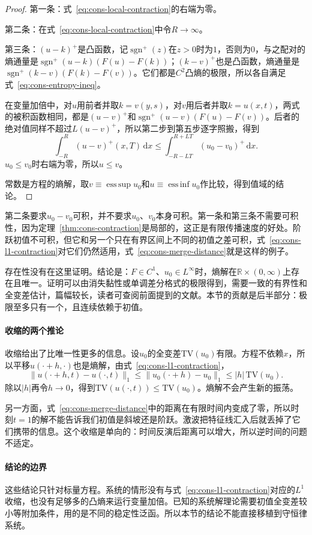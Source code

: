 \begin{proof}
第一条：式~\eqref{eq:cons-local-contraction}的右端为零。

第二条：在式~\eqref{eq:cons-local-contraction}中令$R\to\infty$。

第三条：$(u-k)^{+}$是凸函数，记$\operatorname{sgn}^{+}(z)$在$z>0$时为$1$，否则为$0$，与之配对的熵通量是$\operatorname{sgn}^{+}(u-k)(F(u)-F(k))$；$(k-v)^{+}$也是凸函数，熵通量是$\operatorname{sgn}^{+}(k-v)(F(k)-F(v))$。它们都是$C^2$凸熵的极限，所以各自满足式~\eqref{eq:cons-entropy-ineq}。

在变量加倍中，对$u$用前者并取$k=v(y,s)$，对$v$用后者并取$k=u(x,t)$，两式的被积函数相同，都是$(u-v)^{+}$和$\operatorname{sgn}^{+}(u-v)(F(u)-F(v))$。后者的绝对值同样不超过$L(u-v)^{+}$，所以第二步到第五步逐字照搬，得到
\[
  \int_{-R}^{R}(u-v)^{+}(x,T)\,\mathrm{d}x
  \leq\int_{-R-LT}^{R+LT}(u_0-v_0)^{+}\,\mathrm{d}x .
\]
$u_0\leq v_0$时右端为零，所以$u\leq v$。

常数是方程的熵解，取$v\equiv\operatorname*{ess\,sup}u_0$和$u\equiv\operatorname*{ess\,inf}u_0$作比较，得到值域的结论。
\end{proof}

第二条要求$u_0-v_0$可积，并不要求$u_0$、$v_0$本身可积。第一条和第三条不需要可积性，因为定理~\ref{thm:cons-contraction}是局部的，这正是有限传播速度的好处。阶跃初值不可积，但它和另一个只在有界区间上不同的初值之差可积，式~\eqref{eq:cons-l1-contraction}对它们仍然适用，式~\eqref{eq:cons-merge-distance}就是这样的例子。

存在性没有在这里证明。结论是：$F\in C^1$、$u_0\in L^{\infty}$时，熵解在$\mathbb{R}\times(0,\infty)$上存在且唯一。证明可以由消失黏性或单调差分格式的极限得到，需要一致的有界性和全变差估计，篇幅较长，读者可查阅前面提到的文献。本节的贡献是后半部分：极限至多只有一个，且连续依赖于初值。

\paragraph{收缩的两个推论}
收缩给出了比唯一性更多的信息。设$u_0$的全变差$\mathrm{TV}(u_0)$有限。方程不依赖$x$，所以平移$u(\cdot+h,\cdot)$也是熵解，由式~\eqref{eq:cons-l1-contraction}，
\[
  \lVert u(\cdot+h,t)-u(\cdot,t)\rVert_1\leq\lVert u_0(\cdot+h)-u_0\rVert_1\leq\lvert h\rvert\,\mathrm{TV}(u_0).
\]
除以$\lvert h\rvert$再令$h\to0$，得到$\mathrm{TV}(u(\cdot,t))\leq\mathrm{TV}(u_0)$。熵解不会产生新的振荡。

另一方面，式~\eqref{eq:cons-merge-distance}中的距离在有限时间内变成了零，所以时刻$t=1$的解不能告诉我们初值是斜坡还是阶跃。激波把特征线汇入后就丢掉了它们携带的信息。这个收缩是单向的：时间反演后距离可以增大，所以逆时间的问题不适定。

\paragraph{结论的边界}
这些结论只针对标量方程。系统的情形没有与式~\eqref{eq:cons-l1-contraction}对应的$L^1$收缩，也没有足够多的凸熵来运行变量加倍。已知的系统解理论需要初值全变差较小等附加条件，用的是不同的稳定性泛函。所以本节的结论不能直接移植到守恒律系统。
